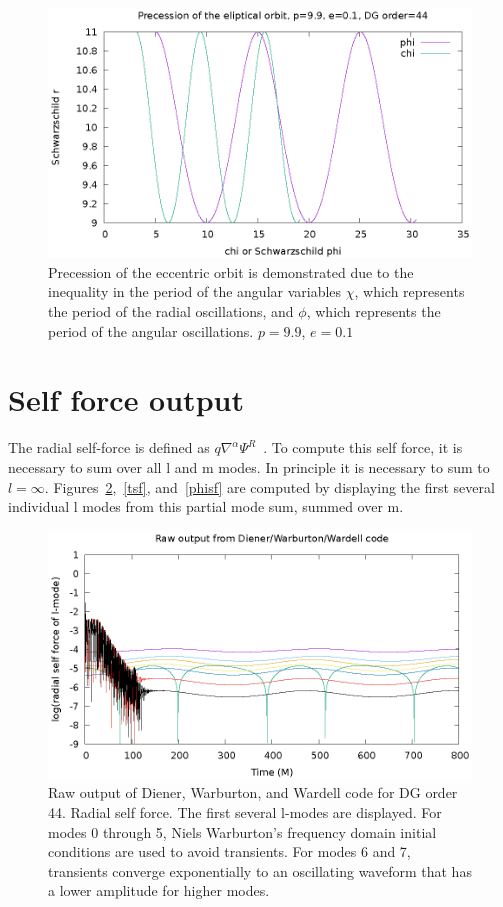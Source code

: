 \begin{figure}
  \includegraphics{precessiondg44p99e01}
  \caption{Precession of the eccentric orbit is demonstrated due to the inequality in the period of the angular variables $\chi$, which represents the period of the radial oscillations, and $\phi$, which represents the period of the angular oscillations. $p=9.9$, $e=0.1$}
  \label{precession}
\end{figure}

\section{Self force output}

The radial self-force is defined as $q\nabla^\alpha\Psi^{R}$~\cite{wardell_vega_thornburg_diener}. To compute this self force, it is necessary to sum over all l and m modes. In principle it is necessary to sum to $l=\infty$. Figures~\ref{rsf},~\ref{tsf}, and~\ref{phisf} are computed by displaying the first several individual l modes from this partial mode sum, summed over m. 


\begin{figure}
  \includegraphics{rawRadialSelForceModes}
  \caption{Raw output of Diener, Warburton, and Wardell code for DG order 44. Radial self force. The first several l-modes are displayed. For modes 0 through 5, Niels Warburton's frequency domain initial conditions are used to avoid transients. For modes 6 and 7, transients converge exponentially to an oscillating waveform that has a lower amplitude for higher modes.}
  \label{rsf}
\end{figure}

